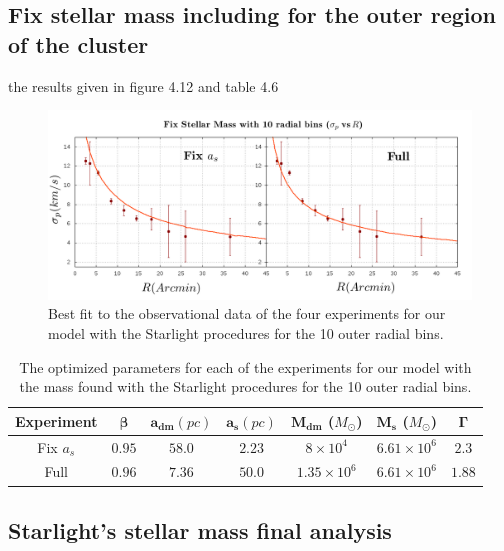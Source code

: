 \subsection{Fix stellar mass including for the outer region of the cluster}

the results given in figure 4.12 and table 4.6

\begin{figure}[H]
\centering
\includegraphics[width=15cm]{images/Starlight_1.png}
\caption[Best fit of our model with the mass found with the Starlight procedures for the 10 outer radial bins]{Best fit to the observational data of the four experiments for our model with the Starlight procedures for the 10 outer radial bins.}
\end{figure}

\begin{table}[H]
\begin{center}
\begin{tabular}{| c| c| c| c| c| c| c|}
    \hline
    \textbf{Experiment} & $\mathbf{\beta}$ & $\mathbf{a_{dm}} (pc)$ & $\mathbf{a_{s}} (pc)$ & $\mathbf{M_{dm}}$ ($M_{\odot}$) & $\mathbf{M_{s}}$ ($M_{\odot}$) & $\mathbf{\Gamma}$\\ \hline
	Fix $a_s$ &	$0.95$ &	$58.0$ &	$2.23$ &	$8 \times 10^{4}$ &	$6.61 \times 10 ^{6}$ &	$2.3$\\ \hline
	Full &	$0.96$ &	$7.36$ &	$50.0$ &	$1.35 \times 10^{6}$ &	$6.61 \times 10^{6}$ &	$1.88$\\ \hline
  \end{tabular} 
\caption[Optimized parameters for our model with the mass found with the Starlight procedures for the 10 outer radial bins.]{The optimized parameters for each of the experiments for our model with the mass found with the Starlight procedures for the 10 outer radial bins.}
\end{center}
\end{table}

\subsection{Starlight's stellar mass final analysis}


